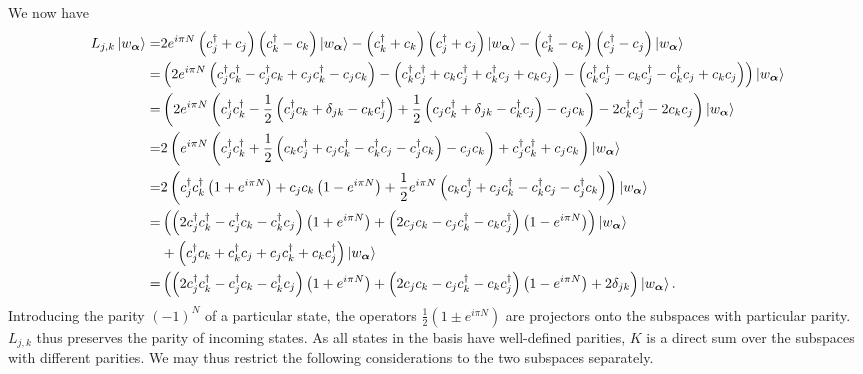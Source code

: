 We now have
\begin{align*}
	L_{j, k}\ket{w_{\vb*{\alpha}}} =& 2e^{i\pi N}\left(c_{j}^{\dagger} + c_{j}\right)\left(c_{k}^{\dagger} - c_{k}\right)\ket{w_{\vb*{\alpha}}} - \left(c_{k}^{\dagger} + c_{k}\right)\left(c_{j}^{\dagger} + c_{j}\right)\ket{w_{\vb*{\alpha}}} - \left(c_{k}^{\dagger} - c_{k}\right)\left(c_{j}^{\dagger} - c_{j}\right)\ket{w_{\vb*{\alpha}}} \\
	                               =& \left(2e^{i\pi N}\left(c_{j}^{\dagger} c_{k}^{\dagger} - c_{j}^{\dagger} c_{k} + c_{j}c_{k}^{\dagger} - c_{j}c_{k}\right) - \left(c_{k}^{\dagger} c_{j}^{\dagger} + c_{k}c_{j}^{\dagger} + c_{k}^{\dagger} c_{j} + c_{k}c_{j}\right) - \left(c_{k}^{\dagger} c_{j}^{\dagger} - c_{k}c_{j}^{\dagger} - c_{k}^{\dagger} c_{j} + c_{k}c_{j}\right)\right)\ket{w_{\vb*{\alpha}}} \\
	                               =& \left(2e^{i\pi N}\left(c_{j}^{\dagger} c_{k}^{\dagger} - \frac{1}{2}\left(c_{j}^{\dagger} c_{k} + \delta_{jk} - c_{k}c_{j}^{\dagger}\right) + \frac{1}{2}\left(c_{j}c_{k}^{\dagger} + \delta_{jk} - c_{k}^{\dagger} c_{j}\right) - c_{j}c_{k}\right) - 2c_{k}^{\dagger} c_{j}^{\dagger} - 2c_{k}c_{j}\right)\ket{w_{\vb*{\alpha}}} \\
	                               =& 2\left(e^{i\pi N}\left(c_{j}^{\dagger} c_{k}^{\dagger} + \frac{1}{2}\left(c_{k}c_{j}^{\dagger} + c_{j}c_{k}^{\dagger} - c_{k}^{\dagger} c_{j} - c_{j}^{\dagger} c_{k}\right) - c_{j}c_{k}\right) + c_{j}^{\dagger} c_{k}^{\dagger} + c_{j}c_{k}\right)\ket{w_{\vb*{\alpha}}} \\
	                               =& 2\left(c_{j}^{\dagger} c_{k}^{\dagger}\left(1 + e^{i\pi N}\right) + c_{j}c_{k}\left(1 - e^{i\pi N}\right) + \frac{1}{2}e^{i\pi N}\left(c_{k}c_{j}^{\dagger} + c_{j}c_{k}^{\dagger} - c_{k}^{\dagger} c_{j} - c_{j}^{\dagger} c_{k}\right)\right)\ket{w_{\vb*{\alpha}}} \\
	                               =& \left(\left(2c_{j}^{\dagger} c_{k}^{\dagger} - c_{j}^{\dagger} c_{k} - c_{k}^{\dagger} c_{j}\right)\left(1 + e^{i\pi N}\right) + \left(2c_{j}c_{k} - c_{j}c_{k}^{\dagger} - c_{k}c_{j}^{\dagger}\right)\left(1 - e^{i\pi N}\right)\right)\ket{w_{\vb*{\alpha}}} \\
	                                &+ \left(c_{j}^{\dagger} c_{k} + c_{k}^{\dagger} c_{j} + c_{j}c_{k}^{\dagger} + c_{k}c_{j}^{\dagger}\right)\ket{w_{\vb*{\alpha}}} \\
	                               =& \left(\left(2c_{j}^{\dagger} c_{k}^{\dagger} - c_{j}^{\dagger} c_{k} - c_{k}^{\dagger} c_{j}\right)\left(1 + e^{i\pi N}\right) + \left(2c_{j}c_{k} - c_{j}c_{k}^{\dagger} - c_{k}c_{j}^{\dagger}\right)\left(1 - e^{i\pi N}\right) + 2\delta_{jk}\right)\ket{w_{\vb*{\alpha}}}.
\end{align*}
Introducing the parity $(-1)^{N}$ of a particular state, the operators $\frac{1}{2}\left(1 \pm e^{i\pi N}\right)$ are projectors onto the subspaces with particular parity. $L_{j, k}$ thus preserves the parity of incoming states. As all states in the basis have well-defined parities, $K$ is a direct sum over the subspaces with different parities. We may thus restrict the following considerations to the two subspaces separately.

